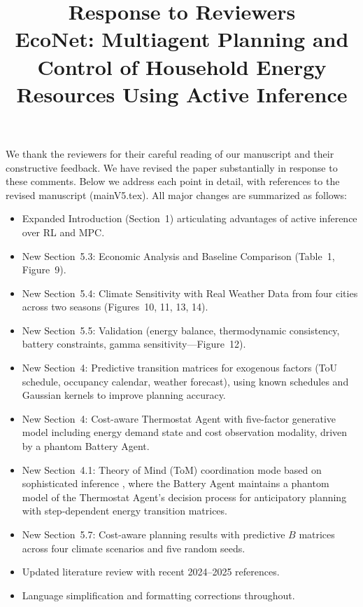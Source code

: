 \documentclass[11pt]{article}
\title{Response to Reviewers\\[0.5em]
\large EcoNet: Multiagent Planning and Control of Household Energy Resources Using Active Inference}
\author{}
\date{}
\begin{document}
\maketitle

We thank the reviewers for their careful reading of our manuscript and their constructive feedback. We have revised the paper substantially in response to these comments. Below we address each point in detail, with references to the revised manuscript (mainV5.tex). All major changes are summarized as follows:

\begin{itemize}
    \item Expanded Introduction (Section~1) articulating advantages of active inference over RL and MPC.
    \item New Section~5.3: Economic Analysis and Baseline Comparison (Table~1, Figure~9).
    \item New Section~5.4: Climate Sensitivity with Real Weather Data from four cities across two seasons (Figures~10, 11, 13, 14).
    \item New Section~5.5: Validation (energy balance, thermodynamic consistency, battery constraints, gamma sensitivity---Figure~12).
    \item New Section~4: Predictive transition matrices for exogenous factors (ToU schedule, occupancy calendar, weather forecast), using known schedules and Gaussian kernels to improve planning accuracy.
    \item New Section~4: Cost-aware Thermostat Agent with five-factor generative model including energy demand state and cost observation modality, driven by a phantom Battery Agent.
    \item New Section~4.1: Theory of Mind (ToM) coordination mode based on sophisticated inference \cite{pitliya2025theory}, where the Battery Agent maintains a phantom model of the Thermostat Agent's decision process for anticipatory planning with step-dependent energy transition matrices.
    \item New Section~5.7: Cost-aware planning results with predictive $B$ matrices across four climate scenarios and five random seeds.
    \item Updated literature review with recent 2024--2025 references.
    \item Language simplification and formatting corrections throughout.
\end{itemize}

\end{document}
